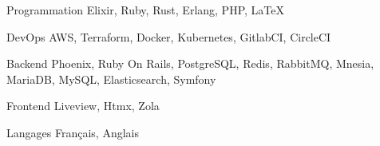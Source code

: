 
\begin{cvskills}
  \cvskill
    {Programmation}
    {Elixir, Ruby, Rust, Erlang, PHP, LaTeX}

  \cvskill
    {DevOps}
    {AWS, Terraform, Docker, Kubernetes, GitlabCI, CircleCI}

  \cvskill
    {Backend}
    {Phoenix, Ruby On Rails, PostgreSQL, Redis, RabbitMQ, Mnesia, MariaDB, MySQL, Elasticsearch, Symfony}

  \cvskill
    {Frontend}
    {Liveview, Htmx, Zola}

  \cvskill
    {Langages}
    {Français, Anglais}
\end{cvskills}
